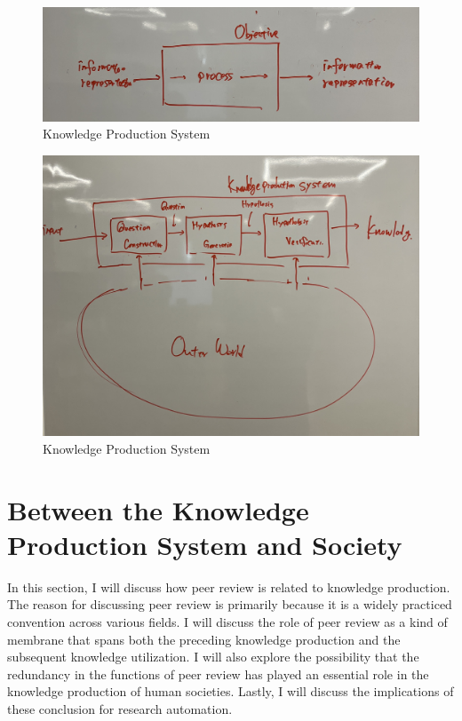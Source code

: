 \documentclass{article}
\begin{document}
\begin{figure}[htb]
    \centering
    \includegraphics[width=\linewidth]{figs/information_processing_system.jpg}
    \caption{Knowledge Production System}
    \label{fig:information_processing_system}
\end{figure}

\begin{figure}[htb]
    \centering
    \includegraphics[width=\linewidth]{figs/knowledge_production_system.jpg}
    \caption{Knowledge Production System}
    \label{fig:knowledge_production_system}
\end{figure}

\section{Between the Knowledge Production System and Society}
In this section, I will discuss how peer review is related to knowledge production. The reason for discussing peer review is primarily because it is a widely practiced convention across various fields. I will discuss the role of peer review as a kind of membrane that spans both the preceding knowledge production and the subsequent knowledge utilization. I will also explore the possibility that the redundancy in the functions of peer review has played an essential role in the knowledge production of human societies. Lastly, I will discuss the implications of these conclusion for research automation.
\end{document}

